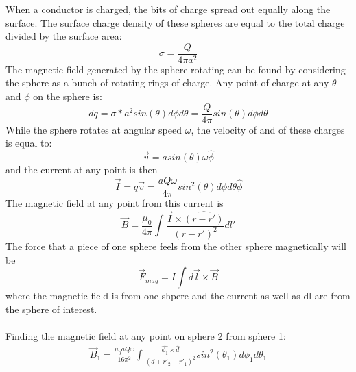 \documentclass[a4paper,12pt]{article}
\newcommand{\V}[1]{\ensuremath{\vec{#1}}}
\newcommand{\F}[2]{\ensuremath{\frac{#1}{#2}}}
\begin{document}
When a conductor is charged, the bits of charge spread out equally along the surface.  The surface charge density of these spheres are equal to the total charge divided by the surface area:
\[\sigma=\F{Q}{4\pi a^2}\]
The magnetic field generated by the sphere rotating can be found by considering the sphere as a bunch of rotating rings of charge.  Any point of charge at any $\theta$ and $\phi$ on the sphere is:
\[dq=\sigma*a^2sin(\theta)d\phi d\theta=\F{Q}{4\pi}sin(\theta)d\phi d\theta\]
While the sphere rotates at angular speed $\omega$, the velocity of and of these charges is equal to:
\[\V{v}=asin(\theta)\omega\hat{\phi}\]
and the current at any point is then
\[\V{I}=q\V{v}=\F{aQ\omega}{4\pi}sin^2(\theta)d\phi d\theta\hat{\phi}\]
The magnetic field at any point from this current is
\[\V{B}=\F{\mu_0}{4\pi}\int\F{\V{I}\times\hat{(r-r')}}{(r-r')^2}dl'\]
The force that a piece of one sphere feels from the other sphere magnetically will be
\[\V{F}_{mag}=I\int d\V{l}\times\V{B}\]
 where the magnetic field is from one shpere and the current as well as dl are from the sphere of interest.
\\
\\
Finding the magnetic field at any point on sphere 2 from sphere 1:
\begin{align*}
\V{B}_1=\F{\mu_0aQ\omega}{16\pi^2}\int\F{\hat{\phi_1}\times\hat{d}}{(d+r'_2-r'_1)^2}sin^2(\theta_1)d\phi_1d\theta_1
\end{align*}
\end{document}
